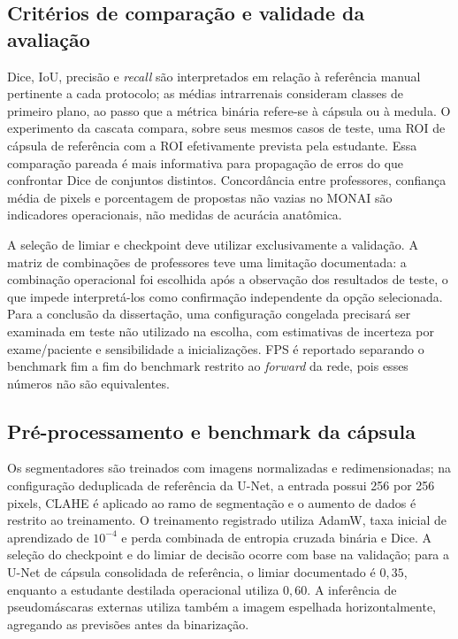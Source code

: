 \documentclass[12pt]{article}
\begin{document}
\subsection{Critérios de comparação e validade da avaliação}
Dice, IoU, precisão e \textit{recall} são interpretados em relação à referência manual pertinente a cada protocolo; as médias intrarrenais consideram classes de primeiro plano, ao passo que a métrica binária refere-se à cápsula ou à medula. O experimento da cascata compara, sobre seus mesmos casos de teste, uma ROI de cápsula de referência com a ROI efetivamente prevista pela estudante. Essa comparação pareada é mais informativa para propagação de erros do que confrontar Dice de conjuntos distintos. Concordância entre professores, confiança média de pixels e porcentagem de propostas não vazias no MONAI são indicadores operacionais, não medidas de acurácia anatômica.

A seleção de limiar e checkpoint deve utilizar exclusivamente a validação. A matriz de combinações de professores teve uma limitação documentada: a combinação operacional foi escolhida após a observação dos resultados de teste, o que impede interpretá-los como confirmação independente da opção selecionada. Para a conclusão da dissertação, uma configuração congelada precisará ser examinada em teste não utilizado na escolha, com estimativas de incerteza por exame/paciente e sensibilidade a inicializações. FPS é reportado separando o benchmark fim a fim do benchmark restrito ao \textit{forward} da rede, pois esses números não são equivalentes.

\subsection{Pré-processamento e benchmark da cápsula}

Os segmentadores são treinados com imagens normalizadas e redimensionadas; na configuração deduplicada de referência da U-Net, a entrada possui 256 por 256 pixels, CLAHE é aplicado ao ramo de segmentação e o aumento de dados é restrito ao treinamento. O treinamento registrado utiliza AdamW, taxa inicial de aprendizado de $10^{-4}$ e perda combinada de entropia cruzada binária e Dice. A seleção do checkpoint e do limiar de decisão ocorre com base na validação; para a U-Net de cápsula consolidada de referência, o limiar documentado é $0{,}35$, enquanto a estudante destilada operacional utiliza $0{,}60$. A inferência de pseudomáscaras externas utiliza também a imagem espelhada horizontalmente, agregando as previsões antes da binarização.
\end{document}
